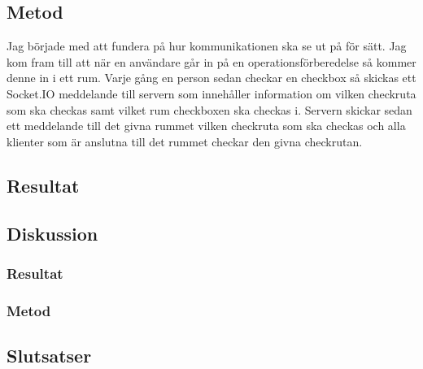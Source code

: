 \subsection{Metod}
Jag började med att fundera på hur kommunikationen ska se ut på för sätt. Jag kom fram till att när en användare går in på en operationsförberedelse så kommer denne in i ett rum. Varje gång en person sedan checkar en checkbox så skickas ett Socket.IO meddelande till servern som innehåller information om vilken checkruta som ska checkas samt vilket rum checkboxen ska checkas i. Servern skickar sedan ett meddelande till det givna rummet vilken checkruta som ska checkas och alla klienter som är anslutna till det rummet checkar den givna checkrutan.

\subsection{Resultat}
\subsection{Diskussion}
\subsubsection{Resultat}
\subsubsection{Metod}
\subsection{Slutsatser}

